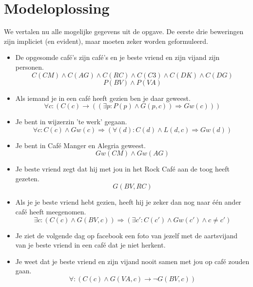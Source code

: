 \documentclass[alternative-exam.tex]{subfiles}
\begin{document}
\section{Modeloplossing}
We vertalen nu alle mogelijke gegevens uit de opgave. De eerste drie beweringen zijn impliciet (en evident), maar moeten zeker worden geformuleerd.
\begin{itemize}
\item De opgesomde caf\'e's zijn caf\'e's en je beste vriend en zijn vijand zijn personen.
\[ C(CM)\wedge C(AG)\wedge C(RC)\wedge C(C3)\wedge C(DK)\wedge C(DG) \]
\[ P(BV) \wedge P(VA)\]
\item Als iemand je in een caf\'e heeft gezien ben je daar geweest.
\[
\forall c: (C(c) \rightarrow ((\exists p : P(p) \wedge G(p,c)) \Rightarrow Gw(c)))
\]
\item Je bent in wijzerzin 'te werk' gegaan.
\[
\forall c: C(c) \wedge Gw(c) \Rightarrow (\forall(d): C(d) \wedge L(d,c) \Rightarrow Gw(d))
\]
\item Je bent in Caf\'e Manger en Alegria geweest.
\[
Gw(CM) \wedge Gw(AG)
\]
\item Je beste vriend zegt dat hij met jou in het Rock Caf\'e aan de toog heeft gezeten.
\[
G(BV,RC)
\]
\item Als je je beste vriend hebt gezien, heeft hij je zeker dan nog naar \'e\'en ander caf\'e heeft meegenomen.
\[
\exists c: (C(c) \wedge G(BV,c)) \Rightarrow (\exists c': C(c') \wedge Gw(c') \wedge c \neq c')
\]
\item Je ziet de volgende dag op facebook een foto van jezelf met de aartsvijand van je beste vriend in een caf\'e dat je niet herkent. 
\[
\]
\item Je weet dat je beste vriend en zijn vijand nooit samen met jou op caf\'e zouden gaan.
\[
\forall : (C(c) \wedge G(VA,c) \rightarrow \neg G(BV,c))
\]

\end{itemize}
\end{document}
